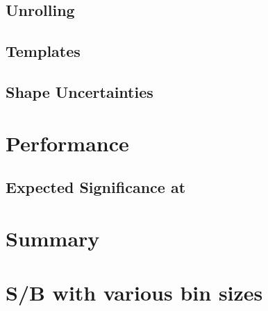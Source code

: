 \documentclass{cmspaper}
\begin{document}
  \subsection{Unrolling}
  \label{sec:unrolling}
  
  
  \subsection{Templates}
  \label{sec:templates}
  
  
  \subsection{Shape Uncertainties}
  \label{sec:shape_uncert}
  

%
\newpage
\section{Performance}
  \label{sec:performance}
  
  
  \subsection{Expected Significance at \intlumiEightTeV }
  \label{sec:exp_significance_12fb}
  
  
%  

%
\newpage
\section{Summary}
     \label{sec:summary}
     



\clearpage 
\appendix
\appendixpage
%     
  
  \newpage
  \section{S/B with various bin sizes}
     \label{app:binsize}
     
  
%     
\end{document}
